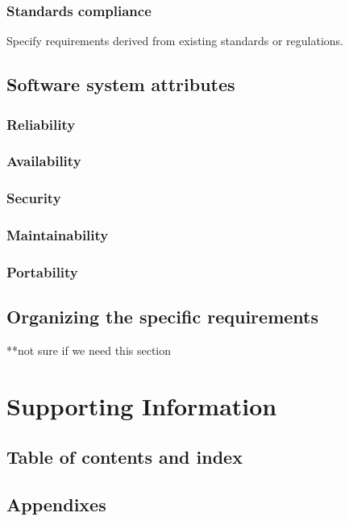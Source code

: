 \documentclass[letterpaper,10pt,draftclsnofoot,onecolumn,titlepage]{IEEEtran}
\begin{document}
	\subsubsection{Standards compliance}
	Specify requirements derived from existing standards or regulations.

	\subsection{Software system attributes}
	\subsubsection{Reliability}
	\subsubsection{Availability}
	\subsubsection{Security}
	\subsubsection{Maintainability}
	\subsubsection{Portability}

	\subsection{Organizing the specific requirements}
	**not sure if we need this section

	\section{Supporting Information}
	\subsection{Table of contents and index}
	\subsection{Appendixes}
\end{document}

